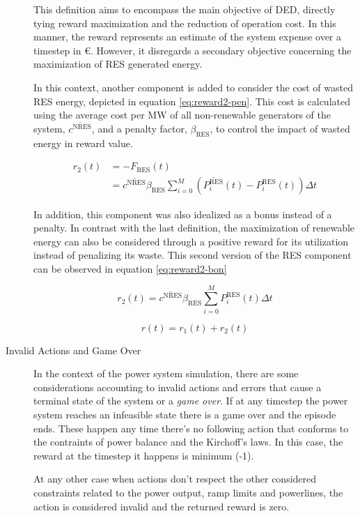 \begin{description}
	This definition aims to encompass the main objective of \ac{DED}, directly tying reward maximization and the reduction of operation cost. In this manner, the reward represents an estimate of the system expense over a timestep in €. However, it disregards a secondary objective concerning the maximization of \ac{RES} generated energy. \par
	In this context, another component is added to consider the cost of wasted \ac{RES} energy, depicted in equation \ref{eq:reward2-pen}. This cost is calculated using the average cost per MW of all non-renewable generators of the system, $\overline{c^\text{NRES}}$, and a penalty factor, $\beta_\text{RES}$, to control the impact of wasted energy in reward value. \par
	
	\begin{equation} \label{eq:reward2-pen}
		\begin{split}
			r_2(t) &= - F_\text{RES}(t) \\
			&= \overline{c^\text{NRES}} \beta_\text{RES} \sum^M_{i=0} (\overline{P^\text{RES}_i}(t) - P^\text{RES}_i(t)) \Delta t 
		\end{split}
	\end{equation}
	
	In addition, this component was also idealized as a bonus instead of a penalty. In contrast with the last definition, the maximization of renewable energy can also be considered through a positive reward for its utilization instead of penalizing its waste. This second version of the \ac{RES} component can be observed in equation \ref{eq:reward2-bon}\par
	
	\begin{equation} \label{eq:reward2-bon}
		r_2(t) = \overline{c^\text{NRES}} \beta_\text{RES} \sum^M_{i=0} P^\text{RES}_i(t) \Delta t 
	\end{equation}
	
	\begin{equation}
		r(t) = r_1(t) + r_2(t)
	\end{equation}
	
	\item[Invalid Actions and Game Over] In the context of the power system simulation, there are some considerations accounting to invalid actions and errors that cause a terminal state of the system or a \textit{game over}. If at any timestep the power system reaches an infeasible state there is a game over and the episode ends. These happen any time there's no following action that conforms to the contraints of power balance and the Kirchoff's laws. In this case, the reward at the timestep it happens is minimum (-1). \par
	At any other case when actions don't respect the other considered constraints related to the power output, ramp limits and powerlines, the action is considered invalid and the returned reward is zero.
	

\end{description}
